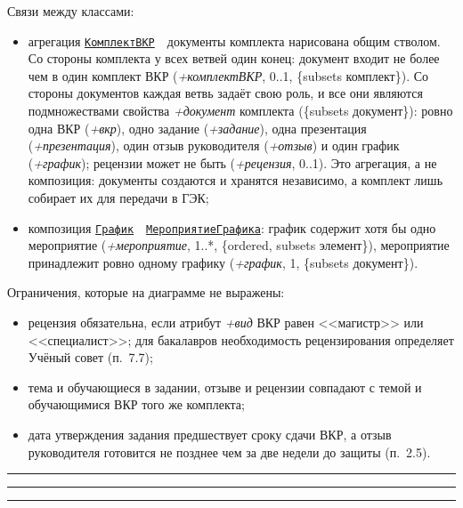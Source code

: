Связи между классами:
\begin{itemize}
	\item агрегация \hyperref[fig:UMLpack]{\Verb|КомплектВКР|}~~документы комплекта нарисована общим стволом. Со стороны комплекта у всех ветвей один конец: документ входит не более чем в один комплект ВКР (\textit{+комплектВКР}, 0..1, \{subsets комплект\}). Со стороны документов каждая ветвь задаёт свою роль, и все они являются подмножествами свойства \textit{+документ} комплекта (\{subsets документ\}): ровно одна ВКР (\textit{+вкр}), одно задание (\textit{+задание}), одна презентация (\textit{+презентация}), один отзыв руководителя (\textit{+отзыв}) и один график (\textit{+график}); рецензии может не быть (\textit{+рецензия}, 0..1). Это агрегация, а не композиция: документы создаются и хранятся независимо, а комплект лишь собирает их для передачи в ГЭК;
	\item композиция \hyperref[fig:UMLpack]{\Verb|График|}~~\hyperref[fig:UMLpack]{\Verb|МероприятиеГрафика|}: график содержит хотя бы одно мероприятие (\textit{+мероприятие}, 1..*, \{ordered, subsets элемент\}), мероприятие принадлежит ровно одному графику (\textit{+график}, 1, \{subsets документ\}).
\end{itemize}

Ограничения, которые на диаграмме не выражены:
\begin{itemize}
	\item рецензия обязательна, если атрибут \textit{+вид} ВКР равен <<магистр>> или <<специалист>>; для бакалавров необходимость рецензирования определяет Учёный совет (п.~7.7);
	\item тема и обучающиеся в задании, отзыве и рецензии совпадают с темой и обучающимися ВКР того же комплекта;
	\item дата утверждения задания предшествует сроку сдачи ВКР, а отзыв руководителя готовится не позднее чем за две недели до защиты (п.~2.5).
\end{itemize}

\vspace{1cm}\rule{\linewidth}{1pt}\vspace{1cm}

\vspace{1cm}\rule{\linewidth}{1pt}\vspace{1cm}

\vspace{1cm}\rule{\linewidth}{1pt}\vspace{1cm}



